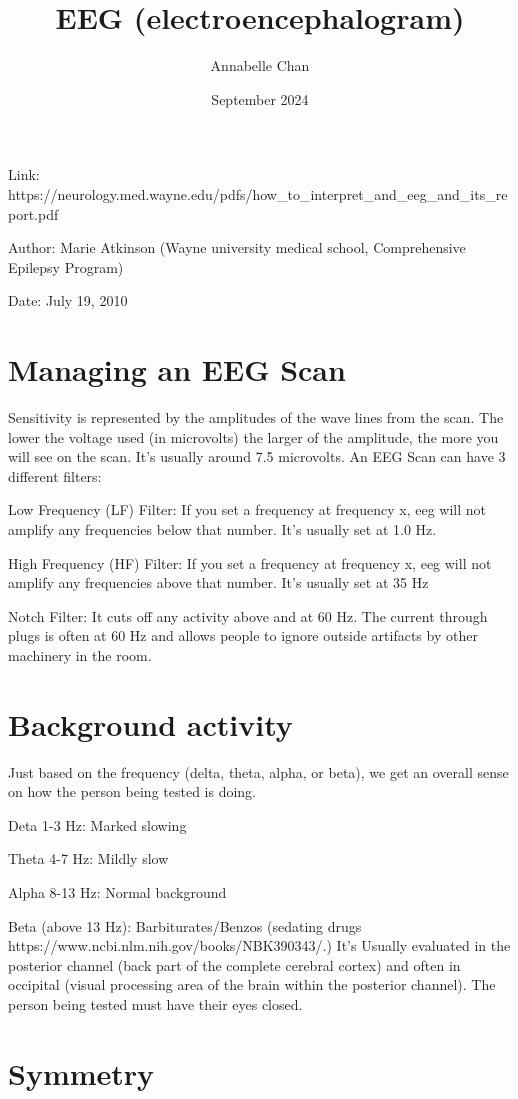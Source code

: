 \documentclass[12pt]{article}
\title{EEG (electroencephalogram)}
\author{Annabelle Chan}
\date{September 2024}
\begin{document}
\maketitle
Link: https://neurology.med.wayne.edu/pdfs/how\_to\_interpret\_and\_eeg\_and\_its\_report.pdf

Author: Marie Atkinson (Wayne university medical school, Comprehensive Epilepsy Program)

Date: July 19, 2010

\section{Managing an EEG Scan}
Sensitivity is represented by the amplitudes of the wave lines from the scan. The lower the voltage used (in microvolts) the larger of the amplitude, the more you will see on the scan. It's usually around 7.5 microvolts.
\medskip
	An EEG Scan can have 3 different filters:

	Low Frequency (LF) Filter:  If you set a frequency at frequency x, eeg will not amplify any frequencies below that number. It's usually set at 1.0 Hz.

	High Frequency (HF) Filter: If you set a frequency at frequency x, eeg will not amplify any frequencies above that number. It's usually set at 35 Hz

	Notch Filter: It cuts off any activity above and at 60 Hz. The current through plugs is often at 60 Hz and allows people to ignore outside artifacts by other machinery in the room.
 
\section{Background activity}
Just based on the frequency (delta, theta, alpha, or beta), we get an overall sense on how the person being tested is doing.

Deta 1-3 Hz: Marked slowing

Theta 4-7 Hz: Mildly slow 

Alpha 8-13 Hz: Normal background

Beta (above 13 Hz): Barbiturates/Benzos (sedating drugs https://www.ncbi.nlm.nih.gov/books/NBK390343/.)
\medskip
	It's Usually evaluated in the posterior channel (back part of the complete cerebral cortex) and often in occipital (visual processing area of the brain within the posterior channel). The person being tested must have their eyes closed.

\section{Symmetry}
\end{document}
